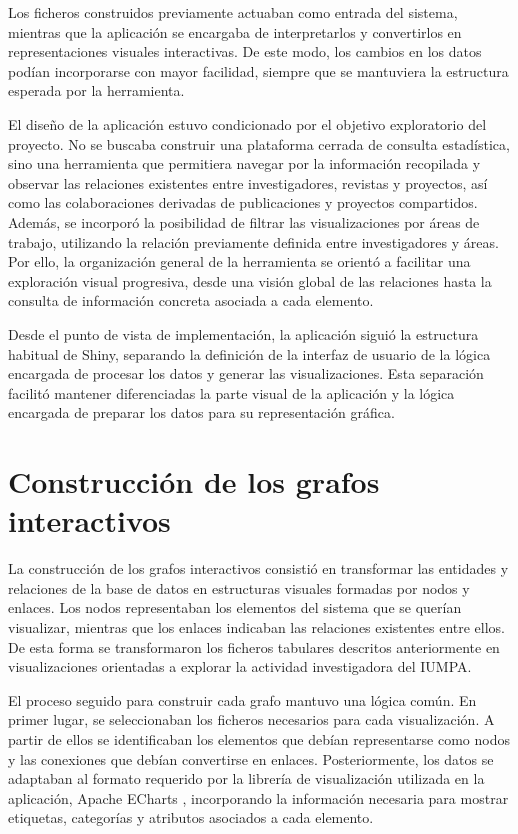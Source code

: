 \documentclass[11pt,spanish,listoffigures,listoftables]{tfgetsinf}
\begin{document}
Los ficheros construidos previamente actuaban como entrada del sistema, mientras que la aplicación se encargaba de interpretarlos y convertirlos en representaciones visuales interactivas. De este modo, los cambios en los datos podían incorporarse con mayor facilidad, siempre que se mantuviera la estructura esperada por la herramienta.

El diseño de la aplicación estuvo condicionado por el objetivo exploratorio del proyecto. No se buscaba construir una plataforma cerrada de consulta estadística, sino una herramienta que permitiera navegar por la información recopilada y observar las relaciones existentes entre investigadores, revistas y proyectos, así como las colaboraciones derivadas de publicaciones y proyectos compartidos. Además, se incorporó la posibilidad de filtrar las visualizaciones por áreas de trabajo, utilizando la relación previamente definida entre investigadores y áreas. Por ello, la organización general de la herramienta se orientó a facilitar una exploración visual progresiva, desde una visión global de las relaciones hasta la consulta de información concreta asociada a cada elemento.

Desde el punto de vista de implementación, la aplicación siguió la estructura habitual de Shiny, separando la definición de la interfaz de usuario de la lógica encargada de procesar los datos y generar las visualizaciones. Esta separación facilitó mantener diferenciadas la parte visual de la aplicación y la lógica encargada de preparar los datos para su representación gráfica.

\section{Construcción de los grafos interactivos}

La construcción de los grafos interactivos consistió en transformar las entidades y relaciones de la base de datos en estructuras visuales formadas por nodos y enlaces. Los nodos representaban los elementos del sistema que se querían visualizar, mientras que los enlaces indicaban las relaciones existentes entre ellos. De esta forma se transformaron los ficheros tabulares descritos anteriormente en visualizaciones orientadas a explorar la actividad investigadora del IUMPA.

El proceso seguido para construir cada grafo mantuvo una lógica común. En primer lugar, se seleccionaban los ficheros necesarios para cada visualización. A partir de ellos se identificaban los elementos que debían representarse como nodos y las conexiones que debían convertirse en enlaces. Posteriormente, los datos se adaptaban al formato requerido por la librería de visualización utilizada en la aplicación, Apache ECharts \cite{echarts}, incorporando la información necesaria para mostrar etiquetas, categorías y atributos asociados a cada elemento.
\end{document}
